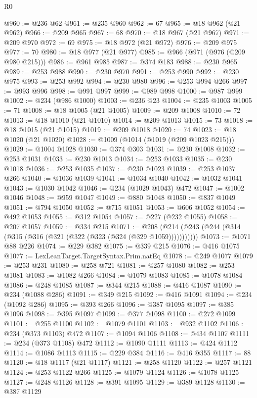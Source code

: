 \begin{lexlean}{R0}
\begin{coremodule}
@960 := @236 @62
@961 := @235 @960
@962 := 67
@965 := @18 @962 (@21 @962)
@966 := @209 @965
@967 := 68
@970 := @18 @967 (@21 @967)
@971 := @209 @970
@972 := 69
@975 := @18 @972 (@21 @972)
@976 := @209 @975
@977 := 70
@980 := @18 @977 (@21 @977)
@985 := @966 (@971 (@976 (@209 @980 @215)))
@986 := @961 @985
@987 := @374 @183
@988 := @230 @965
@989 := @253 @988
@990 := @230 @970
@991 := @253 @990
@992 := @230 @975
@993 := @253 @992
@994 := @230 @980
@996 := @253 @994 @266
@997 := @993 @996
@998 := @991 @997
@999 := @989 @998
@1000 := @987 @999
@1002 := @234 (@986 @1000)
@1003 := @236 @23
@1004 := @235 @1003
@1005 := 71
@1008 := @18 @1005 (@21 @1005)
@1009 := @209 @1008
@1010 := 72
@1013 := @18 @1010 (@21 @1010)
@1014 := @209 @1013
@1015 := 73
@1018 := @18 @1015 (@21 @1015)
@1019 := @209 @1018
@1020 := 74
@1023 := @18 @1020 (@21 @1020)
@1028 := @1009 (@1014 (@1019 (@209 @1023 @215)))
@1029 := @1004 @1028
@1030 := @374 @303
@1031 := @230 @1008
@1032 := @253 @1031
@1033 := @230 @1013
@1034 := @253 @1033
@1035 := @230 @1018
@1036 := @253 @1035
@1037 := @230 @1023
@1039 := @253 @1037 @266
@1040 := @1036 @1039
@1041 := @1034 @1040
@1042 := @1032 @1041
@1043 := @1030 @1042
@1046 := @234 (@1029 @1043) @472
@1047 := @1002 @1046
@1048 := @959 @1047
@1049 := @880 @1048
@1050 := @837 @1049
@1051 := @794 @1050
@1052 := @715 @1051
@1053 := @606 @1052
@1054 := @492 @1053
@1055 := @312 @1054
@1057 := @227 (@232 @1055)
@1058 := @207 @1057
@1059 := @334 @215
@1071 := @208 (@214 (@243 (@244 (@314 (@315 (@316 (@321 (@322 (@323 (@324 (@329 @1059)))))))))))
@1073 := @1071 @88 @226
@1074 := @229 @382
@1075 := @339 @215
@1076 := @416 @1075
@1077 := LexLeanTarget.TargetSyntax.Prim.natEq
@1078 := @249 @1077
@1079 := @253 @231
@1080 := @258 @721
@1081 := @257 @1080
@1082 := @253 @1081
@1083 := @1082 @266
@1084 := @1079 @1083
@1085 := @1078 @1084
@1086 := @248 @1085
@1087 := @344 @215
@1088 := @416 @1087
@1090 := @234 (@1088 @286)
@1091 := @349 @215
@1092 := @416 @1091
@1094 := @234 (@1092 @286)
@1095 := @393 @266
@1096 := @387 @1095
@1097 := @385 @1096
@1098 := @395 @1097
@1099 := @377 @1098
@1100 := @272 @1099
@1101 := @255 @1100
@1102 := @1079 @1101
@1103 := @932 @1102
@1106 := @234 (@373 @1103) @472
@1107 := @1094 @1106
@1108 := @434 @1107
@1111 := @234 (@373 @1108) @472
@1112 := @1090 @1111
@1113 := @424 @1112
@1114 := @1086 @1113
@1115 := @229 @384
@1116 := @416 @355
@1117 := 88
@1120 := @18 @1117 (@21 @1117)
@1121 := @258 @1120
@1122 := @257 @1121
@1124 := @253 @1122 @266
@1125 := @1079 @1124
@1126 := @1078 @1125
@1127 := @248 @1126
@1128 := @391 @1095
@1129 := @389 @1128
@1130 := @387 @1129

\end{coremodule}
\end{lexlean}
